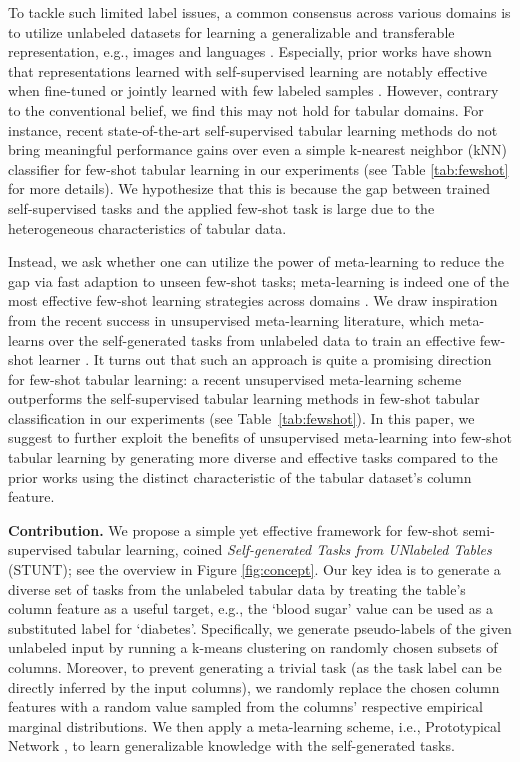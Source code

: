 To tackle such limited label issues, a common consensus across various domains is to utilize unlabeled datasets for learning a generalizable and transferable representation, e.g., images \citep{chen2020simclr} and languages \citep{radford2019language}. Especially, prior works have shown that representations learned with self-supervised learning are notably effective when fine-tuned or jointly learned with few labeled samples \citep{tian2020rethinking,perez2021true,lee2021improving, lee2022r}. However, contrary to the conventional belief, we find this may not hold for tabular domains. For instance, recent state-of-the-art self-supervised tabular learning methods \citep{yoon2020vime,ucar2021subtab} do not bring meaningful performance gains over even a simple k-nearest neighbor (kNN) classifier for few-shot tabular learning in our experiments (see Table \ref{tab:fewshot} for more details). We hypothesize that this is because the gap between trained self-supervised tasks and the applied few-shot task is large due to the heterogeneous characteristics of tabular data.

Instead, we ask whether one can utilize the power of meta-learning to reduce the gap via fast adaption to unseen few-shot tasks; meta-learning is indeed one of the most effective few-shot learning strategies across domains \citep{finn2017maml,gu2018meta,xie2018few}. We draw inspiration from the recent success in unsupervised meta-learning literature, which meta-learns over the self-generated tasks from unlabeled data to train an effective few-shot learner \citep{khodadadeh2019umtra,lee2021metagmvae}. It turns out that such an approach is quite a promising direction for few-shot tabular learning: a recent unsupervised meta-learning scheme \citep{hsu2018cactus} outperforms the self-supervised tabular learning methods in few-shot tabular classification in our experiments (see Table~\ref{tab:fewshot}).
In this paper, we suggest to further exploit the benefits of unsupervised meta-learning into few-shot tabular learning by generating more diverse and effective tasks compared to the prior works using the distinct characteristic of the tabular dataset's column feature.

\textbf{Contribution.} We propose a simple yet effective framework for few-shot semi-supervised  tabular learning, coined \emph{Self-generated Tasks from UNlabeled Tables} (STUNT); see the overview in Figure \ref{fig:concept}.
Our key idea is to generate a diverse set of tasks from the unlabeled tabular data by treating the table's column feature as a useful target, e.g., the `blood sugar' value can be used as a substituted label for `diabetes'. Specifically, we generate pseudo-labels of the given unlabeled input by running a k-means clustering on randomly chosen subsets of columns. Moreover, to prevent generating a trivial task (as the task label can be directly inferred by the input columns), we randomly replace the chosen column features with a random value sampled from the columns' respective empirical marginal distributions. We then apply a meta-learning scheme, i.e., Prototypical Network \citep{snell2017proto}, to learn generalizable knowledge with the self-generated tasks.

